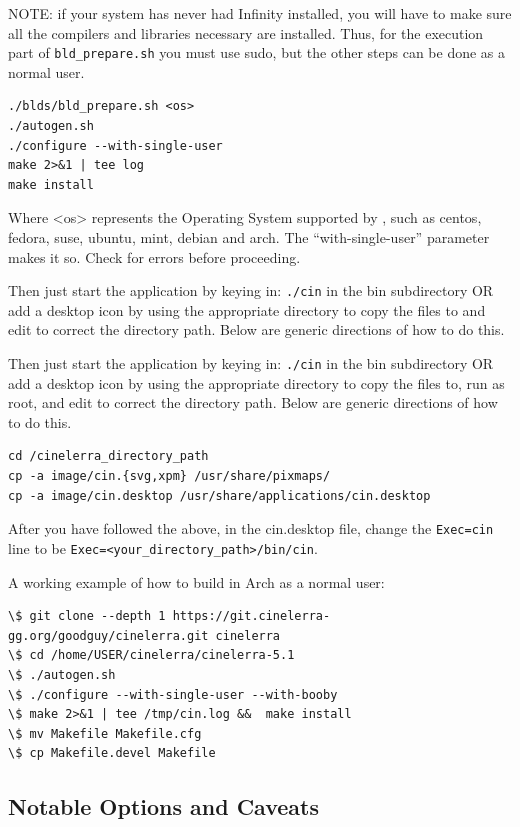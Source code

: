 NOTE: if your system has never had \CGG{} Infinity installed, you
will have to make sure all the compilers and libraries necessary are
installed. Thus, for the execution part of \texttt{bld\_prepare.sh} you must use sudo, but the other steps can be done as a normal user.

\begin{lstlisting}[style=sh]
./blds/bld_prepare.sh <os>
./autogen.sh
./configure --with-single-user
make 2>&1 | tee log
make install
\end{lstlisting}
Where <os> represents the Operating System supported by \CGG{}, such
as centos, fedora, suse, ubuntu, mint, debian and arch.
The ``with-single-user'' parameter makes it so.
Check for errors before proceeding.


Then just start the application by keying in: \texttt{./cin} in the
bin subdirectory OR add a desktop icon by using the appropriate
directory to copy the files to and edit to
correct the directory path.  Below are generic directions of how to
do this.

Then just start the application by keying in: \texttt{./cin} in the
bin subdirectory OR add a desktop icon by using the appropriate
directory to copy the files to, run as root, and edit to correct the directory path.  Below are generic directions of how to
do this.

\begin{lstlisting}[style=sh]
cd /cinelerra_directory_path
cp -a image/cin.{svg,xpm} /usr/share/pixmaps/
cp -a image/cin.desktop /usr/share/applications/cin.desktop
\end{lstlisting}

After you have followed the above, in the cin.desktop file, change
the \texttt{Exec=cin} line to be
\texttt{Exec=<your\_directory\_path>/bin/cin}.

A working example of how to build in Arch as a normal user:

\begin{lstlisting}[style=sh]
\$ git clone --depth 1 https://git.cinelerra-gg.org/goodguy/cinelerra.git cinelerra
\$ cd /home/USER/cinelerra/cinelerra-5.1
\$ ./autogen.sh
\$ ./configure --with-single-user --with-booby
\$ make 2>&1 | tee /tmp/cin.log &&  make install
\$ mv Makefile Makefile.cfg
\$ cp Makefile.devel Makefile
\end{lstlisting}

\subsection{Notable Options and Caveats}%
\label{sub:notable_options_and_caveats}

